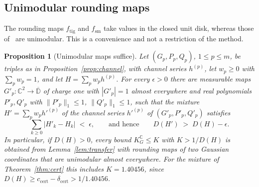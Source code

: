 \documentclass[11pt,reqno]{amsart}
\newtheorem{proposition}[theorem]{Proposition}
\theoremstyle{definition}
\numberwithin{equation}{section}
\newcommand{\C}{\mathbb{C}}
\newcommand{\D}{\mathbb{D}}
\newcommand{\KGC}{K_G^{\C}}
\newcommand{\lone}[1]{\|#1\|_1}
\newcommand{\ftig}{f_{\mathrm{tig}}}
\newcommand{\fsm}{f_{\mathrm{sm}}}
\newcommand{\ccert}{c_{\mathrm{cert}}}
\newcommand{\dcert}{\delta_{\mathrm{cert}}}
\begin{document}
\subsection{Unimodular rounding maps}\label{sec:unimodular}
The rounding maps $\ftig$ and $\fsm$ take values in the closed unit disk, whereas those of~\cite{Haa87,HJM26} are unimodular. This is a convenience and not a restriction of the method.

\begin{proposition}[Unimodular maps suffice]\label{prop:unimodular}
Let $(G_p,P_p,Q_p)$, $1\le p\le m$, be triples as in Proposition~\ref{prop:channel}, with channel series $h^{(p)}$, let $w_p\ge0$ with $\sum_pw_p=1$, and let $H=\sum_pw_ph^{(p)}$. For every $\epsilon>0$ there are measurable maps $G'_p:\C^2\to\overline{\D}$ of charge one with $|G'_p|=1$ almost everywhere and real polynomials $P'_p,Q'_p$ with $\lone{P'_p}\le1$, $\lone{Q'_p}\le1$, such that the mixture $H'=\sum_pw_ph'^{(p)}$ of the channel series $h'^{(p)}$ of $(G'_p,P'_p,Q'_p)$ satisfies
\[
  \sum_{k\ge0}|H'_k-H_k|\;<\;\epsilon ,\qquad\text{and hence}\qquad D(H')\;>\;D(H)-\epsilon .
\]
In particular, if $D(H)>0$, every bound $\KGC\le K$ with $K>1/D(H)$ is obtained from Lemma~\ref{lem:transfer} with rounding maps of two Gaussian coordinates that are unimodular almost everywhere. For the mixture of Theorem~\ref{thm:cert} this includes $K=1.40456$, since $D(H)\ge\ccert-\dcert>1/1.40456$.
\end{proposition}
\end{document}
